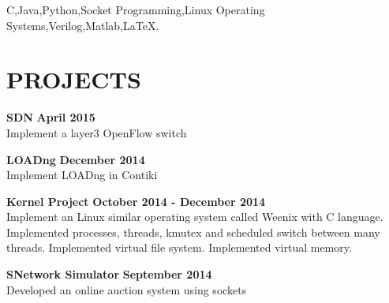 \documentclass[margin,line]{resume}
\begin{document}
\begin{resume}
    C,\hspace{2mm}Java,\hspace{2mm}Python,\hspace{2mm}Socket Programming,\hspace{2mm}Linux Operating Systems,\hspace{2mm}Verilog,\hspace{2mm}Matlab,\hspace{2mm}\LaTeX.

\sectionline

    \section{\mysidestyle \textbf{\large{P}\small{ROJECTS}}}

    \textbf{\listing SDN} \hfill \textbf{April 2015}\vspace{-3mm}\\\vspace{-1mm}%
    Implement a layer3 OpenFlow switch \vspace{1mm}    

    \textbf{\listing LOADng} \hfill \textbf{December 2014}\vspace{-3mm}\\\vspace{-1mm}%
    Implement LOADng in Contiki \vspace{1mm}   

    \textbf{\listing Kernel Project} \hfill \textbf{October 2014 - December 2014}\vspace{-3mm}\\\vspace{-1mm}%
    Implement an Linux similar operating system called Weenix with C language.
	Implemented processes, threads, kmutex and scheduled switch between many threads.
	Implemented virtual file system.
	Implemented virtual memory. \vspace{1mm}    

    \textbf{\listing SNetwork Simulator} \hfill \textbf{September 2014}\vspace{-3mm}\\\vspace{-1mm}%
    Developed an online auction system using sockets \vspace{1mm}    


\end{resume}
\end{document}
